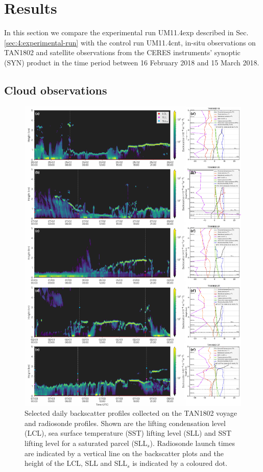 \section{Results}
\label{sec:4:results}

In this section we compare the experimental run UM11.4exp described in Sec. \ref{sec:4:experimental-run} with the control run UM11.4cnt, in-situ observations on TAN1802 and satellite observations from the CERES instruments' synoptic (SYN) product \citep{loeb2018} in the time period between 16 February 2018 and 15 March 2018.

\subsection{Cloud observations}

\begin{figure}[p]
\centering
\includegraphics[width=\textwidth]{chapter4/fig/backscatter_rs.pdf}
\caption[Selected daily backscatter profiles collected on the TAN1802 voyage
and radiosonde profiles]{Selected daily backscatter profiles collected on the TAN1802 voyage
and radiosonde profiles. Shown are the lifting condensation level (LCL),
sea surface temperature (SST) lifting level (SLL) and SST lifting level for a saturated parcel (SLL$_s$).
Radiosonde launch times are indicated by a vertical line on the backscatter
plots and the height of the LCL, SLL and SLL$_s$ is indicated by a coloured dot.
}
\label{fig:4:backscatter-rs}
\end{figure}

